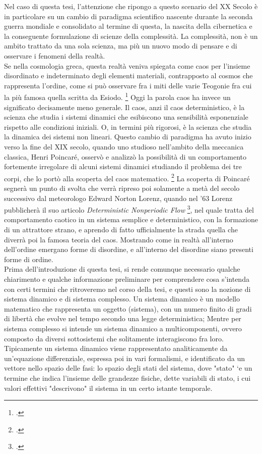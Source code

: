 Nel caso di questa tesi, l'attenzione che ripongo a questo scenario del XX Secolo
è in particolare su un cambio di paradigma scientifico
nascente durante la seconda guerra mondiale e consolidato al termine di questa,
la nascita della cibernetica e la conseguente formulazione
di scienze della complessità.
La complessità, non è un ambito trattato da una sola scienza,
ma più un nuovo modo di pensare e di osservare i fenomeni
della realtà. \\
Se nella cosmologia greca, questa realtà veniva spiegata come caos per 
l’insieme disordinato e indeterminato degli elementi materiali, contrapposto al cosmos che rappresenta l'ordine,
come si può osservare fra i miti delle varie Teogonie
fra cui la più famosa quella scritta da Esiodo. \footcite{esiodoteogonia}
Oggi la parola caos ha invece un significato decisamente meno generale. 
Il caos, anzi il caos deterministico, è la scienza che studia i 
sistemi dinamici che esibiscono una sensibilità esponenziale rispetto alle condizioni iniziali.
O, in termini più rigorosi, è la scienza che studia la dinamica dei sistemi non lineari.
Questo cambio di paradigma ha avuto inizio verso la fine del XIX secolo,
quando uno studioso nell'ambito della meccanica classica, Henri Poincaré,
osservò e analizzò la possibilità di un comportamento fortemente irregolare
di alcuni sistemi dinamici studiando il problema dei tre corpi,
che lo portò alla scoperta del caos matematico. \footcite{poincaréproblema}
La scoperta di Poincaré segnerà un punto di svolta che verrà
ripreso poi solamente a metà del secolo successivo dal meteorologo
Edward Norton Lorenz,
quando nel '63 Lorenz pubblicherà il suo articolo 
\textit{Deterministic Nonperiodic Flow} \footcite{Lorenzdnf},
nel quale tratta del comportamento caotico in un sistema semplice
e deterministico, con la formazione di un attrattore strano,
e aprendo di fatto ufficialmente la strada quella che diverrà poi
la famosa teoria del caos.
Mostrando come in realtà all'interno dell'ordine emergano forme di disordine,
e all'interno del disordine siano presenti forme di ordine. \\
Prima dell'introduzione di questa tesi, si rende comunque necessario
qualche chiarimento e qualche informazione 
preliminare per comprendere cosa s'intenda con certi termini che ritroveremo
nel corso della tesi, e questi sono la nozione di sistema dinamico e di sistema complesso.
Un sistema dinamico è un modello matematico che rappresenta un oggetto (sistema),
con un numero finito di gradi di libertà che evolve nel tempo secondo una legge
deterministica; Mentre per sistema complesso si intende un sistema dinamico a multicomponenti,
ovvero composto da diversi sottosistemi che solitamente interagiscono fra loro.
Tipicamente un sistema dinamico viene rappresentato analiticamente da un’equazione
differenziale, espressa poi in vari formalismi, e identificato da un vettore nello
spazio delle fasi: lo spazio degli stati del sistema, dove "stato" `e un termine che
indica l’insieme delle grandezze fisiche, dette variabili di stato, i cui valori
effettivi "descrivono" il sistema in un certo istante temporale.

